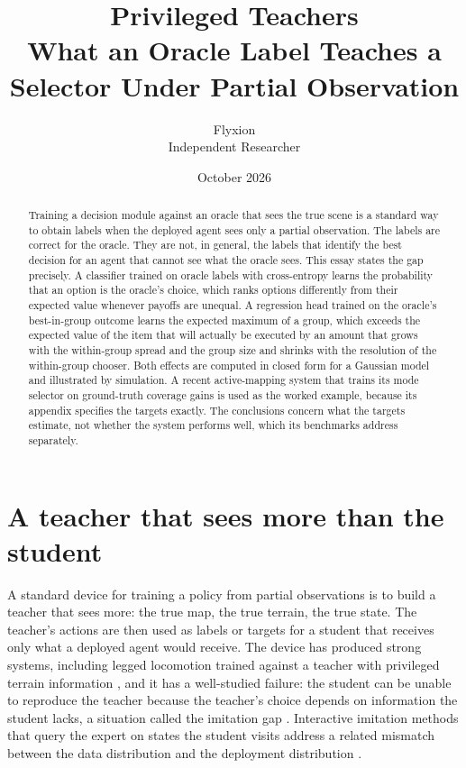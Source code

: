 \documentclass[11pt]{article}
\title{Privileged Teachers\\[4pt]
\large What an Oracle Label Teaches a Selector Under Partial Observation}
\author{Flyxion\\Independent Researcher}
\date{October 2026}
\theoremstyle{definition}
\begin{document}
\maketitle

\begin{abstract}
\noindent
Training a decision module against an oracle that sees the true scene is a standard way to obtain labels when the deployed agent sees only a partial observation. The labels are correct for the oracle. They are not, in general, the labels that identify the best decision for an agent that cannot see what the oracle sees. This essay states the gap precisely. A classifier trained on oracle labels with cross-entropy learns the probability that an option is the oracle's choice, which ranks options differently from their expected value whenever payoffs are unequal. A regression head trained on the oracle's best-in-group outcome learns the expected maximum of a group, which exceeds the expected value of the item that will actually be executed by an amount that grows with the within-group spread and the group size and shrinks with the resolution of the within-group chooser. Both effects are computed in closed form for a Gaussian model and illustrated by simulation. A recent active-mapping system that trains its mode selector on ground-truth coverage gains is used as the worked example, because its appendix specifies the targets exactly. The conclusions concern what the targets estimate, not whether the system performs well, which its benchmarks address separately.
\end{abstract}

\section{A teacher that sees more than the student}

A standard device for training a policy from partial observations is to build a teacher that sees more: the true map, the true terrain, the true state. The teacher's actions are then used as labels or targets for a student that receives only what a deployed agent would receive. The device has produced strong systems, including legged locomotion trained against a teacher with privileged terrain information \citep{lee2020}, and it has a well-studied failure: the student can be unable to reproduce the teacher because the teacher's choice depends on information the student lacks, a situation called the imitation gap \citep{weihs2021,warrington2021}. Interactive imitation methods that query the expert on states the student visits address a related mismatch between the data distribution and the deployment distribution \citep{ross2011}.
\end{document}
